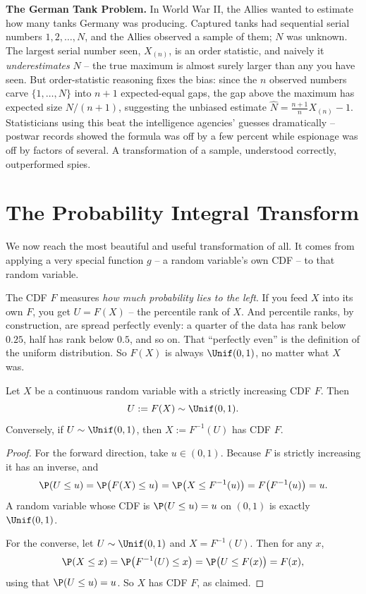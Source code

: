 \begin{paradoxbox}
\textbf{The German Tank Problem.} In World War II, the Allies wanted to estimate how many
tanks Germany was producing. Captured tanks had sequential serial numbers
$1,2,\dots,N$, and the Allies observed a sample of them; $N$ was unknown. The largest
serial number seen, $X_{(n)}$, is an order statistic, and naively it \emph{underestimates}
$N$ -- the true maximum is almost surely larger than any you have seen. But order-statistic
reasoning fixes the bias: since the $n$ observed numbers carve $\{1,\dots,N\}$ into $n+1$
expected-equal gaps, the gap above the maximum has expected size $N/(n+1)$, suggesting the
unbiased estimate $\hat N = \tfrac{n+1}{n}X_{(n)} - 1$.
Statisticians using this beat the intelligence agencies' guesses dramatically -- postwar
records showed the formula was off by a few percent while espionage was off by factors of
several. A transformation of a sample, understood correctly, outperformed spies.
\end{paradoxbox}

\section{The Probability Integral Transform}
\label{ch16:pit}

We now reach the most beautiful and useful transformation of all. It comes from applying a
very special function $g$ -- a random variable's own CDF -- to that random variable.

\begin{intuitionbox}
The CDF $F$ measures \emph{how much probability lies to the left}. If you feed $X$ into its
own $F$, you get $U = F(X)$ -- the percentile rank of $X$. And percentile ranks, by
construction, are spread perfectly evenly: a quarter of the data has rank below $0.25$,
half has rank below $0.5$, and so on. That ``perfectly even'' is the definition of the
uniform distribution. So $F(X)$ is always $\Unif(0,1)$, no matter what $X$ was.
\end{intuitionbox}

\begin{theorem}
\label{ch16:pit-thm}
Let $X$ be a continuous random variable with a strictly increasing CDF $F$. Then
\[
  U := F(X) \sim \Unif(0,1).
\]
Conversely, if $U \sim \Unif(0,1)$, then $X := F^{-1}(U)$ has CDF $F$.
\end{theorem}

\begin{proof}
For the forward direction, take $u \in (0,1)$. Because $F$ is strictly increasing it has an
inverse, and
\[
  \P(U \le u) = \P\big(F(X) \le u\big) = \P\big(X \le F^{-1}(u)\big)
              = F\big(F^{-1}(u)\big) = u.
\]
A random variable whose CDF is $\P(U\le u) = u$ on $(0,1)$ is exactly $\Unif(0,1)$.

For the converse, let $U \sim \Unif(0,1)$ and $X = F^{-1}(U)$. Then for any $x$,
\[
  \P(X \le x) = \P\big(F^{-1}(U) \le x\big) = \P\big(U \le F(x)\big) = F(x),
\]
using that $\P(U \le u) = u$. So $X$ has CDF $F$, as claimed.
\end{proof}

